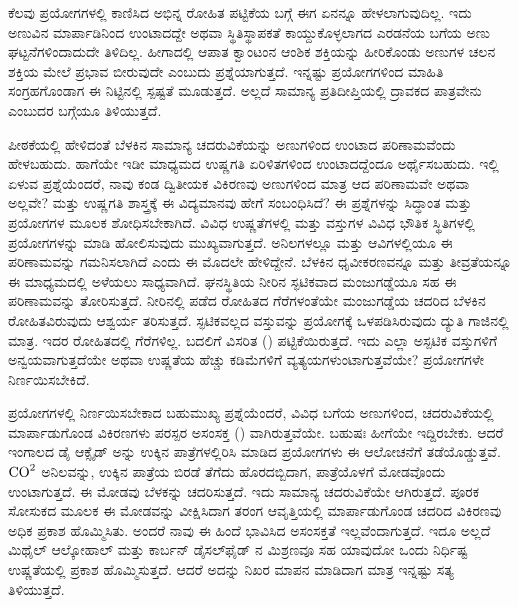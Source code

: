 ಕೆಲವು ಪ್ರಯೋಗಗಳಲ್ಲಿ ಕಾಣಿಸಿದ ಅಭಿನ್ನ ರೋಹಿತ ಪಟ್ಟಿಕೆಯ ಬಗ್ಗೆ ಈಗ ಏನನ್ನೂ ಹೇಳಲಾಗುವುದಿಲ್ಲ. ಇದು ಅಣುವಿನ ಮಾರ್ಪಾಡಿನಿಂದ ಉಂಟಾದದ್ದೇ ಅಥವಾ ಸ್ಥಿತಿಸ್ಥಾಪಕತೆ ಕಾಯ್ದುಕೊಳ್ಳಲಾಗದ ಎರಡನೆಯ ಬಗೆಯ ಅಣು ಘಟ್ಟನೆಗಳಿಂದಾದುದೇ ತಿಳಿದಿಲ್ಲ. ಹೀಗಾದಲ್ಲಿ ಆಪಾತ ಕ್ವಾಂಟಂನ ಆಂಶಿಕ ಶಕ್ತಿಯನ್ನು ಹೀರಿಕೊಂಡು ಅಣುಗಳ ಚಲನ ಶಕ್ತಿಯ ಮೇಲೆ ಪ್ರಭಾವ ಬೀರುವುದೇ ಎಂಬುದು ಪ್ರಶ್ನೆಯಾಗುತ್ತದೆ. ಇನ್ನಷ್ಟು ಪ್ರಯೋಗಗಳಿಂದ ಮಾಹಿತಿ ಸಂಗ್ರಹಗೊಂಡಾಗ ಈ ನಿಟ್ಟಿನಲ್ಲಿ ಸ್ಪಷ್ಟತೆ ಮೂಡುತ್ತದೆ. ಅಲ್ಲದೆ ಸಾಮಾನ್ಯ ಪ್ರತಿದೀಪ್ತಿಯಲ್ಲಿ ದ್ರಾವಕದ ಪಾತ್ರವೇನು ಎಂಬುದರ ಬಗ್ಗೆಯೂ ತಿಳಿಯುತ್ತದೆ.



ಪೀಠಕೆಯಲ್ಲಿ ಹೇಳಿದಂತೆ ಬೆಳಕಿನ ಸಾಮಾನ್ಯ ಚದರುವಿಕೆಯನ್ನು ಅಣುಗಳಿಂದ ಉಂಟಾದ ಪರಿಣಾಮವೆಂದು ಹೇಳಬಹುದು. ಹಾಗೆಯೇ ಇಡೀ ಮಾಧ್ಯಮದ ಉಷ್ಣಗತಿ ಏರಿಳಿತಗಳಿಂದ ಉಂಟಾದದ್ದೆಂದೂ ಅರ್ಥೈಸಬಹುದು. ಇಲ್ಲಿ ಏಳುವ ಪ್ರಶ್ನೆಯೆಂದರೆ, ನಾವು ಕಂಡ ದ್ವಿತೀಯಕ ವಿಕಿರಣವು ಅಣುಗಳಿಂದ ಮಾತ್ರ ಆದ ಪರಿಣಾಮವೇ ಅಥವಾ ಅಲ್ಲವೇ? ಮತ್ತು ಉಷ್ಣಗತಿ ಶಾಸ್ತ್ರಕ್ಕೆ ಈ ವಿದ್ಯಮಾನವು ಹೇಗೆ ಸಂಬಂಧಿಸಿದೆ? ಈ ಪ್ರಶ್ನೆಗಳನ್ನು ಸಿದ್ಧಾಂತ ಮತ್ತು ಪ್ರಯೋಗಗಳ ಮೂಲಕ ಶೋಧಿಸಬೇಕಾಗಿದೆ. ವಿವಿಧ ಉಷ್ಣತೆಗಳಲ್ಲಿ ಮತ್ತು ವಸ್ತುಗಳ ವಿವಿಧ ಭೌತಿಕ ಸ್ಥಿತಿಗಳಲ್ಲಿ ಪ್ರಯೋಗಗಳನ್ನು ಮಾಡಿ ಹೋಲಿಸುವುದು ಮುಖ್ಯವಾಗುತ್ತದೆ. ಅನಿಲಗಳಲ್ಲೂ ಮತ್ತು ಆವಿಗಳಲ್ಲಿಯೂ ಈ ಪರಿಣಾಮವನ್ನು ಗಮನಿಸಲಾಗಿದೆ ಎಂದು ಈ ಮೊದಲೇ ಹೇಳಿದ್ದೇನೆ. ಬೆಳಕಿನ ಧೃವೀಕರಣವನ್ನೂ ಮತ್ತು ತೀವ್ರತೆಯನ್ನೂ ಈ ಮಾಧ್ಯಮದಲ್ಲಿ ಅಳೆಯಲು ಸಾಧ್ಯವಾಗಿದೆ. ಘನಸ್ಥಿತಿಯ ನೀರಿನ ಸ್ಫಟಿಕವಾದ ಮಂಜುಗಡ್ಡೆಯೂ ಸಹ ಈ ಪರಿಣಾಮವನ್ನು ತೋರಿಸುತ್ತದೆ. ನೀರಿನಲ್ಲಿ ಪಡೆದ ರೋಹಿತದ ಗೆರೆಗಳಂತೆಯೇ ಮಂಜುಗಡ್ಡೆಯ ಚದರಿದ ಬೆಳಕಿನ ರೋಹಿತವಿರುವುದು ಆಶ್ವರ್ಯ ತರಿಸುತ್ತದೆ. ಸ್ಫಟಿಕವಲ್ಲದ ವಸ್ತುವನ್ನು ಪ್ರಯೋಗಕ್ಕೆ ಒಳಪಡಿಸಿರುವುದು ದ್ಯುತಿ ಗಾಜಿನಲ್ಲಿ ಮಾತ್ರ. ಇದರ ರೋಹಿತದಲ್ಲಿ ಗೆರೆಗಳಿಲ್ಲ. ಬದಲಿಗೆ ವಿಸರಿತ () ಪಟ್ಟಿಕೆಯಿರುತ್ತದೆ. ಇದು ಎಲ್ಲಾ ಅಸ್ಪಟಿಕ ವಸ್ತುಗಳಿಗೆ ಅನ್ವಯವಾಗುತ್ತದೆಯೇ ಅಥವಾ ಉಷ್ಣತೆಯ ಹೆಚ್ಚು ಕಡಿಮೆಗಳಿಗೆ ವ್ಯತ್ಯಯಗಳುಂಟಾಗುತ್ತವೆಯೇ? ಪ್ರಯೋಗಗಳೇ ನಿರ್ಣಯಿಸಬೇಕಿದೆ.



ಪ್ರಯೋಗಗಳಲ್ಲಿ ನಿರ್ಣಯಿಸಬೇಕಾದ ಬಹುಮುಖ್ಯ ಪ್ರಶ್ನೆಯೆಂದರೆ, ವಿವಿಧ ಬಗೆಯ ಅಣುಗಳಿಂದ, ಚದರುವಿಕೆಯಲ್ಲಿ ಮಾರ್ಪಾಡುಗೊಂಡ ವಿಕಿರಣಗಳು ಪರಸ್ಪರ ಅಸಂಸಕ್ತ () ವಾಗಿರುತ್ತವೆಯೇ. ಬಹುಷಃ ಹೀಗೆಯೇ ಇದ್ದಿರಬೇಕು. ಆದರೆ ಇಂಗಾಲದ ಡೈ ಆಕ್ಸೈಡ್ ಅನ್ನು ಉಕ್ಕಿನ ಪಾತ್ರೆಗಳಲ್ಲಿರಿಸಿ ಮಾಡಿದ ಪ್ರಯೋಗಗಳು ಈ ಆಲೋಚನೆಗೆ ತಡೆಯೊಡ್ಡುತ್ತವೆ. ${\rm CO}^2$ ಅನಿಲವನ್ನು, ಉಕ್ಕಿನ ಪಾತ್ರೆಯ ಬಿರಡೆ ತೆಗೆದು ಹೊರದಬ್ಬಿದಾಗ, ಪಾತ್ರೆಯೊಳಗೆ ಮೋಡವೊಂದು ಉಂಟಾಗುತ್ತದೆ. ಈ ಮೋಡವು ಬೆಳಕನ್ನು ಚದರಿಸುತ್ತದೆ. ಇದು ಸಾಮಾನ್ಯ ಚದರುವಿಕೆಯೇ ಆಗಿರುತ್ತದೆ. ಪೂರಕ ಸೋಸುಕದ ಮೂಲಕ ಈ ಮೋಡವನ್ನು ವೀಕ್ಷಿಸಿದಾಗ ತರಂಗ ಆವೃತ್ತಿಯಲ್ಲಿ ಮಾರ್ಪಾಡುಗೊಂಡ ಚದರಿದ ವಿಕಿರಣವು ಅಧಿಕ ಪ್ರಕಾಶ ಹೊಮ್ಮಿಸಿತು. ಅಂದರೆ ನಾವು ಈ ಹಿಂದೆ ಭಾವಿಸಿದ ಅಸಂಸಕ್ತತೆ ಇಲ್ಲವೆಂದಾಗುತ್ತದೆ. ಇದೂ ಅಲ್ಲದೆ ಮಿಥೈಲ್ ಆಲ್ಕೋಹಾಲ್ ಮತ್ತು ಕಾರ್ಬನ್ ಡೈಸಲ್‍ಫೈಡ್ ನ ಮಿಶ್ರಣವೂ ಸಹ ಯಾವುದೋ ಒಂದು ನಿರ್ಧಿಷ್ಟ ಉಷ್ಣತೆಯಲ್ಲಿ ಪ್ರಕಾಶ ಹೊಮ್ಮಿಸುತ್ತದೆ. ಆದರೆ ಅದನ್ನು ನಿಖರ ಮಾಪನ ಮಾಡಿದಾಗ ಮಾತ್ರ ಇನ್ನಷ್ಟು ಸತ್ಯ ತಿಳಿಯುತ್ತದೆ.



